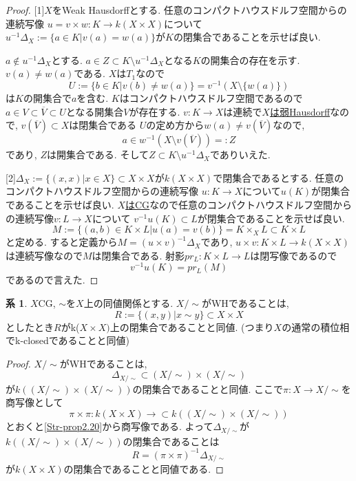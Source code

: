 \documentclass[dvipdfmx,a4paper,11pt]{article}
\theoremstyle{definition}
\newtheorem{cor}[thm]{系}
\begin{document}
\begin{proof}

[1]$X$をWeak Hausdorffとする. 
任意のコンパクトハウスドルフ空間からの連続写像
$u = v \times w : K \to k(X \times X)$について
$u^{-1}\Delta_X := \{a \in K | v(a)=w(a) \}$が$K$の閉集合であることを示せば良い.

$a \not \in u^{-1}\Delta_X$とする.
$a \in Z \subset  K \setminus u^{-1}\Delta_X$となる$K$の開集合の存在を示す.
$v(a) \neq w(a)$である. $X$は$T_1$なので
$$
U:= \{ b \in K | v(b) \neq w(a) \} = v^{-1}(X \setminus \{w(a)\})
$$
は$K$の開集合で$a$を含む.
$K$はコンパクトハウスドルフ空間であるので
$a \in V \subset \overline{V} \subset U$となる開集合$V$が存在する.
$v : K \to X$は連続で\underline{$X$は弱Hausdorff}なので, $v(\overline{V}) \subset X$は閉集合である
$U$の定め方から$w(a) \neq v(\overline{V})$なので, 
$$
a \in w^{-1}( X \setminus v(\overline{V}) ) =: Z
$$
であり,  $Z$は開集合である. 
そして$Z\subset K \setminus u^{-1}\Delta_X$でありいえた.

[2]$\Delta_X := \{ (x,x)| x \in X\}\subset X \times X$が$k(X \times X)$で閉集合であるとする. 
任意のコンパクトハウスドルフ空間からの連続写像
$u : K \to X$について$u(K)$が閉集合であることを示せば良い.
\underline{$X$はCG}なので任意のコンパクトハウスドルフ空間からの連続写像$v : L \to X$について
$v^{-1}u(K) \subset L$が閉集合であることを示せば良い.
$$
M := \{ (a,b) \in K \times L | u(a) =v(b)\}=K\times_{X}L \subset K \times L
$$
と定める. 
すると定義から$M = (u \times v)^{-1}\Delta_{X}$であり, 
$u \times v : K \times L \to k(X \times X)$は連続写像なので$M$は閉集合である. 
射影$pr_{L} : K \times L \to L$は閉写像であるので
$$
v^{-1}u(K) = pr_{L}(M)
$$
であるので言えた. 
\end{proof}

 \begin{tcolorbox}
 [colback = white, colframe = green!35!black, fonttitle = \bfseries,breakable = true]
\begin{cor}\cite[Cor2.21]{Str}
\label{Str-cor2.21}
$X$CG, $\sim$を$X$上の同値関係とする. 
$X/\sim $がWHであることは, 
$$
R:= \{ (x,y)| x \sim y\} \subset X \times X
$$
としたとき$R$がk($X \times X)$上の閉集合であることと同値.
(つまり$X$の通常の積位相でk-closedであることと同値)
\end{cor}
 \end{tcolorbox}
\begin{proof}
$X/\sim $がWHであることは,
$$
\Delta_{X/\sim} \subset (X/\sim) \times (X/\sim)
$$
が$k((X/\sim) \times (X/\sim))$の閉集合であることと同値.
ここで$\pi : X \to X/\sim$を商写像として
$$
\pi \times \pi : k(X \times X) \to \subset k((X/\sim) \times (X/\sim))
$$
とおくと\ref{Str-prop2.20}から商写像である.
よって$\Delta_{X/\sim} $が$k((X/\sim) \times (X/\sim))$の閉集合であることは
$$
R = (\pi \times \pi )^{-1}\Delta_{X/\sim} 
$$
が$ k(X \times X)$の閉集合であることと同値である.
\end{proof}
\end{document}
